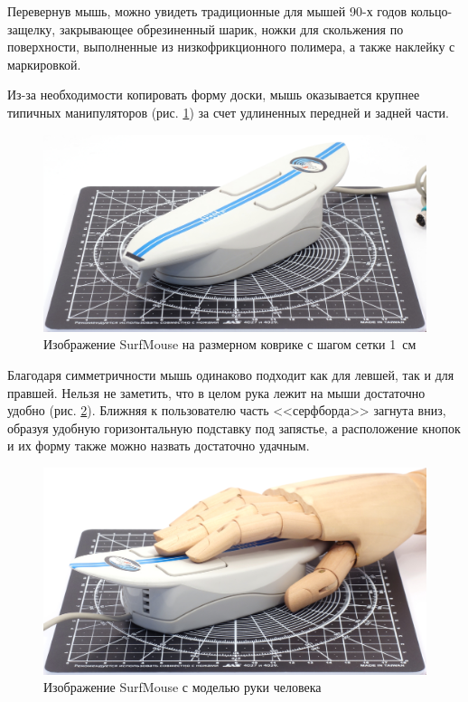 \documentclass[11pt, a4paper]{article}
\begin{document}
Перевернув мышь, можно увидеть традиционные для мышей 90-х годов кольцо-защелку, закрывающее обрезиненный шарик, ножки для скольжения по поверхности, выполненные из низкофрикционного полимера, а также наклейку с маркировкой.

Из-за необходимости копировать форму доски, мышь оказывается крупнее типичных манипуляторов (рис. \ref{fig:SurfMouseSize}) за счет удлиненных передней и задней части.

\begin{figure}[h]
    \centering
    \includegraphics[scale=0.5]{2000_surf_mouse/size_30.jpg}
    \caption{Изображение SurfMouse на размерном коврике с шагом сетки 1~см}
    \label{fig:SurfMouseSize}
\end{figure}

Благодаря симметричности мышь одинаково подходит как для левшей, так и для правшей. Нельзя не заметить, что в целом рука лежит на мыши достаточно удобно (рис. \ref{fig:SurfMouseHand}). Ближняя к пользователю часть <<серфборда>> загнута вниз, образуя удобную горизонтальную подставку под запястье, а расположение кнопок и их форму также можно назвать достаточно удачным.

\begin{figure}[h]
    \centering
    \includegraphics[scale=0.5]{2000_surf_mouse/hand_30.jpg}
    \caption{Изображение SurfMouse с моделью руки человека}
    \label{fig:SurfMouseHand}
\end{figure}
\end{document}
